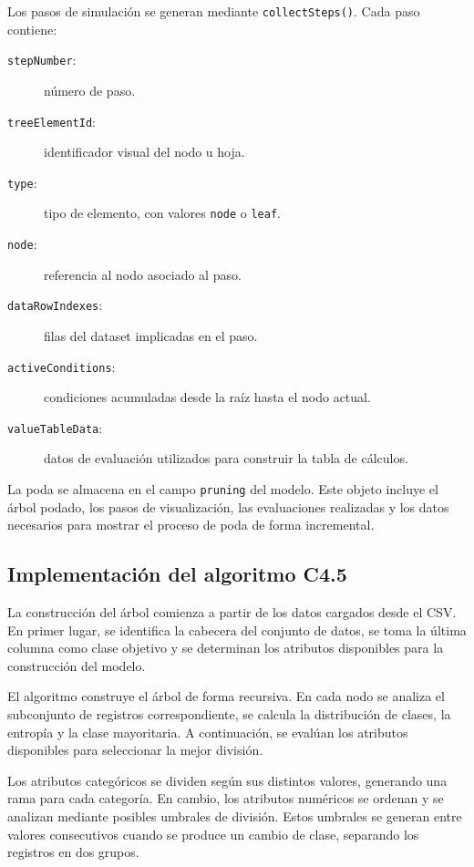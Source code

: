Los pasos de simulación se generan mediante \texttt{collectSteps()}. Cada paso contiene:

\begin{description}
    \item[\texttt{stepNumber}:] número de paso.
    \item[\texttt{treeElementId}:] identificador visual del nodo u hoja.
    \item[\texttt{type}:] tipo de elemento, con valores \texttt{node} o \texttt{leaf}.
    \item[\texttt{node}:] referencia al nodo asociado al paso.
    \item[\texttt{dataRowIndexes}:] filas del dataset implicadas en el paso.
    \item[\texttt{activeConditions}:] condiciones acumuladas desde la raíz hasta el nodo actual.
    \item[\texttt{valueTableData}:] datos de evaluación utilizados para construir la tabla de cálculos.
\end{description}

La poda se almacena en el campo \texttt{pruning} del modelo. Este objeto incluye el árbol podado, los pasos de visualización, las evaluaciones realizadas y los datos necesarios para mostrar el proceso de poda de forma incremental.

\subsection{Implementación del algoritmo C4.5}

La construcción del árbol comienza a partir de los datos cargados desde el CSV. En primer lugar, se identifica la cabecera del conjunto de datos, se toma la última columna como clase objetivo y se determinan los atributos disponibles para la construcción del modelo.

El algoritmo construye el árbol de forma recursiva. En cada nodo se analiza el subconjunto de registros correspondiente, se calcula la distribución de clases, la entropía y la clase mayoritaria. A continuación, se evalúan los atributos disponibles para seleccionar la mejor división.

Los atributos categóricos se dividen según sus distintos valores, generando una rama para cada categoría. En cambio, los atributos numéricos se ordenan y se analizan mediante posibles umbrales de división. Estos umbrales se generan entre valores consecutivos cuando se produce un cambio de clase, separando los registros en dos grupos.

